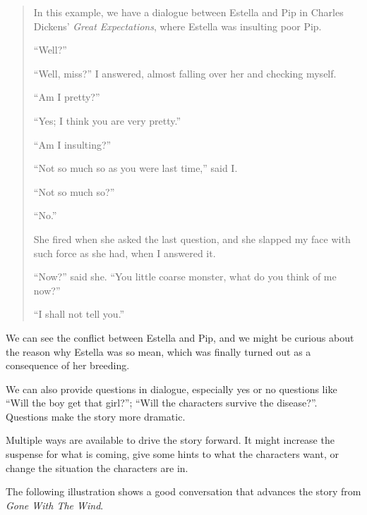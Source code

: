 \begin{quotation}
In this example, we have a dialogue between Estella and Pip in Charles Dickens'
\emph{Great Expectations}\cite{GreatExpect}, where Estella was insulting poor Pip.

{\sffamily 
``Well?'' \par
``Well, miss?'' I answered, almost falling over her and checking myself. \par
``Am I pretty?'' \par
``Yes; I think you are very pretty.'' \par
``Am I insulting?'' \par
``Not so much so as you were last time,'' said I. \par
``Not so much so?'' \par
``No.'' \par
She fired when she asked the last question, and she slapped my face with such 
force as she had, when I answered it. \par
``Now?'' said she. ``You little coarse monster, what do you think of me now?''
\par ``I shall not tell you.''
}
\end{quotation}

We can see the conflict between Estella and Pip, and we might be curious about 
the reason why Estella was so mean, which was finally turned out as a consequence 
of her breeding.

We can also provide questions in dialogue, especially yes or no questions like 
``Will the boy get that girl?''; ``Will the characters survive the disease?''. 
Questions make the story more dramatic.

Multiple ways are available to drive the story forward. It might increase the 
suspense for what is coming, give some hints to what the characters want, or 
change the situation the characters are in.

The following illustration shows a good conversation that advances the story from 
\emph{Gone With The Wind}\cite{GWTW}.


